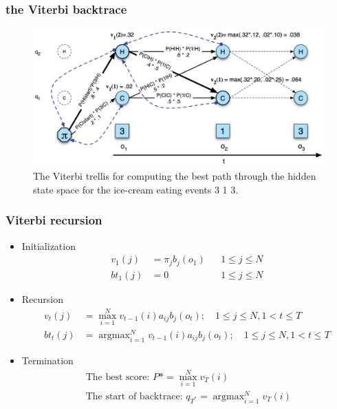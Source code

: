 \documentclass{beamer}
\begin{document}
\begin{frame}
    \frametitle{the Viterbi backtrace}
    \begin{figure}[H]
        \centering
        \includegraphics[width=\textwidth]{img/4.png}
        \caption{The Viterbi trellis for computing the best path through the hidden state space for the ice-cream eating events 3 1 3.}
        \end{figure}
\end{frame}
\begin{frame}
    \frametitle{Viterbi recursion}
\begin{itemize}
    \item Initialization $$
\begin{aligned} v_{1}(j) &=\pi_{j} b_{j}\left(o_{1}\right) & & 1 \leq j \leq N \\ b t_{1}(j) &=0 & & 1 \leq j \leq N \end{aligned}
$$
\item Recursion $$
\begin{aligned} v_{t}(j) &=\max_{i=1}^{N} v_{t-1}(i) a_{i j} b_{j}\left(o_{t}\right) ; \quad 1 \leq j \leq N, 1<t \leq T \\ b t_{t}(j) &={\operatorname{argmax}} ^{N}_{i=1} v_{t-1}(i) a_{i j} b_{j}\left(o_{t}\right) ; \quad 1 \leq j \leq N, 1<t \leq T \end{aligned}
$$
\item Termination $$
\begin{array}{c}{\text { The best score: } P * =\max _{i=1}^{N} v_{T}(i)} \\ {\text { The start of backtrace: } q_{T^{*}}={\operatorname{argmax}} ^{N}_{i=1} v_{T}(i)}\end{array}
$$
\end{itemize}
\end{frame}
\end{document}
